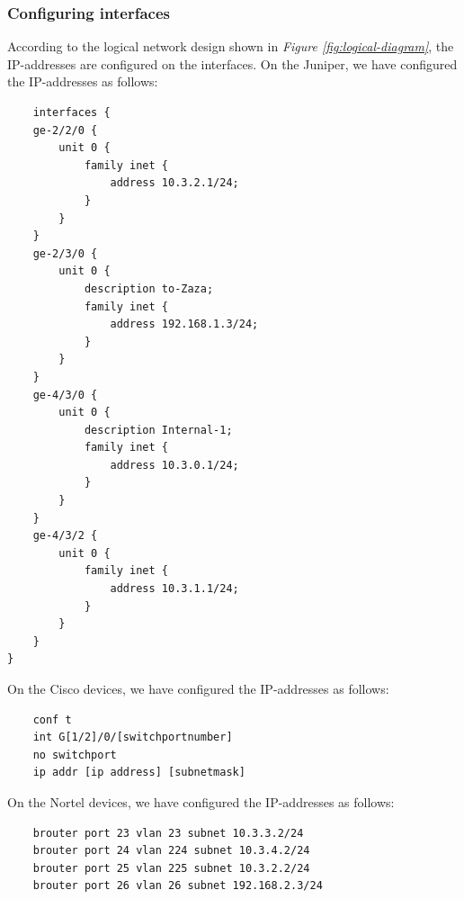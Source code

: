 \documentclass[10pt,a4paper]{article}
\begin{document}
\subsubsection{Configuring interfaces}
According to the logical network design shown in \textit{Figure \ref{fig:logical-diagram}}, the IP-addresses are configured on the interfaces. On the Juniper, we have configured the IP-addresses as follows:
\begin{verbatim}
    interfaces {
    ge-2/2/0 {
        unit 0 {
            family inet {
                address 10.3.2.1/24;
            }
        }
    }
    ge-2/3/0 {
        unit 0 {
            description to-Zaza;
            family inet {
                address 192.168.1.3/24;
            }
        }
    }
    ge-4/3/0 {
        unit 0 {
            description Internal-1;     
            family inet {
                address 10.3.0.1/24;
            }
        }
    }
    ge-4/3/2 {
        unit 0 {
            family inet {
                address 10.3.1.1/24;
            }
        }
    }
}
\end{verbatim}

On the Cisco devices, we have configured the IP-addresses as follows:
\begin{verbatim}
    conf t
    int G[1/2]/0/[switchportnumber]
    no switchport
    ip addr [ip address] [subnetmask]
\end{verbatim}

On the Nortel devices, we have configured the IP-addresses as follows:
\begin{verbatim}
    brouter port 23 vlan 23 subnet 10.3.3.2/24
    brouter port 24 vlan 224 subnet 10.3.4.2/24
    brouter port 25 vlan 225 subnet 10.3.2.2/24
    brouter port 26 vlan 26 subnet 192.168.2.3/24
\end{verbatim}
\end{document}
